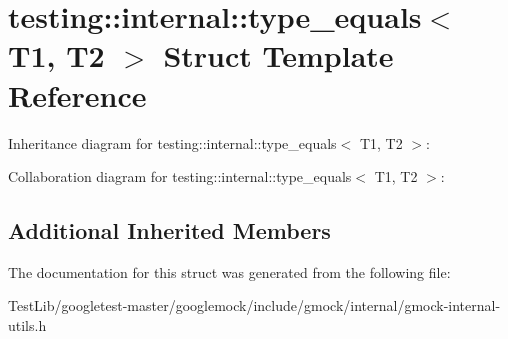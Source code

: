 \hypertarget{structtesting_1_1internal_1_1type__equals}{}\section{testing\+:\+:internal\+:\+:type\+\_\+equals$<$ T1, T2 $>$ Struct Template Reference}
\label{structtesting_1_1internal_1_1type__equals}


Inheritance diagram for testing\+:\+:internal\+:\+:type\+\_\+equals$<$ T1, T2 $>$\+:


Collaboration diagram for testing\+:\+:internal\+:\+:type\+\_\+equals$<$ T1, T2 $>$\+:
\subsection*{Additional Inherited Members}


The documentation for this struct was generated from the following file\+:\begin{DoxyCompactItemize}
\item 
Test\+Lib/googletest-\/master/googlemock/include/gmock/internal/gmock-\/internal-\/utils.\+h\end{DoxyCompactItemize}
